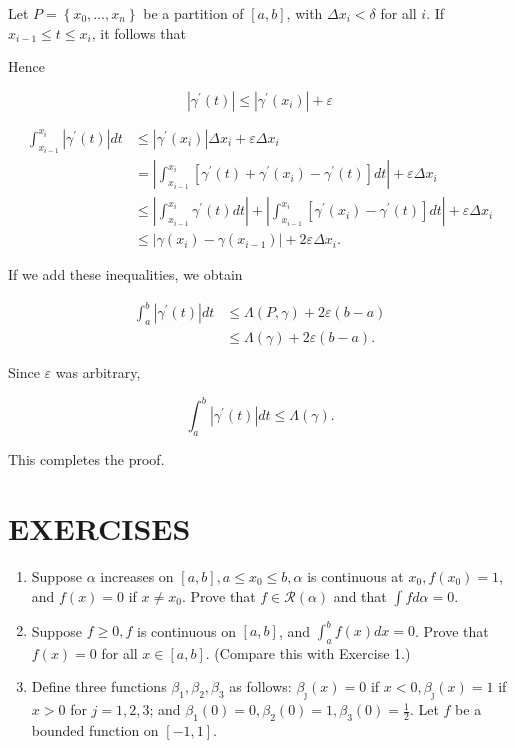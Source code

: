 \documentclass[10pt]{article}
\begin{document}
Let $P=\left\{x_{0}, \ldots, x_{n}\right\}$ be a partition of $[a, b]$, with $\Delta x_{i}<\delta$ for all $i$. If $x_{i-1} \leq t \leq x_{i}$, it follows that

Hence

$$
\left|\gamma^{\prime}(t)\right| \leq\left|\gamma^{\prime}\left(x_{i}\right)\right|+\varepsilon
$$

$$
\begin{aligned}
\int_{x_{i-1}}^{x_{i}}\left|\gamma^{\prime}(t)\right| d t & \leq\left|\gamma^{\prime}\left(x_{i}\right)\right| \Delta x_{i}+\varepsilon \Delta x_{i} \\
& =\left|\int_{x_{i-1}}^{x_{i}}\left[\gamma^{\prime}(t)+\gamma^{\prime}\left(x_{i}\right)-\gamma^{\prime}(t)\right] d t\right|+\varepsilon \Delta x_{i} \\
& \leq\left|\int_{x_{i-1}}^{x_{i}} \gamma^{\prime}(t) d t\right|+\left|\int_{x_{i-1}}^{x_{i}}\left[\gamma^{\prime}\left(x_{i}\right)-\gamma^{\prime}(t)\right] d t\right|+\varepsilon \Delta x_{i} \\
& \leq\left|\gamma\left(x_{i}\right)-\gamma\left(x_{i-1}\right)\right|+2 \varepsilon \Delta x_{i} .
\end{aligned}
$$

If we add these inequalities, we obtain

$$
\begin{aligned}
\int_{a}^{b}\left|\gamma^{\prime}(t)\right| d t & \leq \Lambda(P, \gamma)+2 \varepsilon(b-a) \\
& \leq \Lambda(\gamma)+2 \varepsilon(b-a) .
\end{aligned}
$$

Since $\varepsilon$ was arbitrary,

$$
\int_{a}^{b}\left|\gamma^{\prime}(t)\right| d t \leq \Lambda(\gamma) .
$$

This completes the proof.

\section{EXERCISES}
\begin{enumerate}
  \item Suppose $\alpha$ increases on $[a, b], a \leq x_{0} \leq b, \alpha$ is continuous at $x_{0}, f\left(x_{0}\right)=1$, and $f(x)=0$ if $x \neq x_{0}$. Prove that $f \in \mathscr{R}(\alpha)$ and that $\int f d \alpha=0$.

  \item Suppose $f \geq 0, f$ is continuous on $[a, b]$, and $\int_{a}^{b} f(x) d x=0$. Prove that $f(x)=0$ for all $x \in[a, b]$. (Compare this with Exercise 1.)

  \item Define three functions $\beta_{1}, \beta_{2}, \beta_{3}$ as follows: $\beta_{\jmath}(x)=0$ if $x<0, \beta_{\jmath}(x)=1$ if $x>0$ for $j=1,2,3$; and $\beta_{1}(0)=0, \beta_{2}(0)=1, \beta_{3}(0)=\frac{1}{2}$. Let $f$ be a bounded function on $[-1,1]$.

\end{enumerate}
\end{document}
